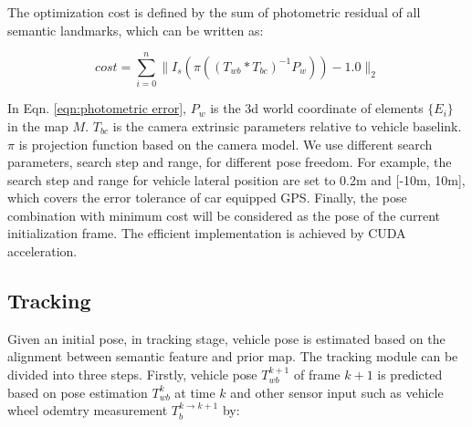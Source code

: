 \documentclass[letterpaper, 10 pt, conference]{ieeeconf}
\begin{document}




The optimization cost is defined by the sum of photometric residual \cite{engel2017direct} of all semantic landmarks, which can be written as: 


\begin{equation}
    cost = \sum_{i = 0}^n \|I_s(\pi((T_{wb} * T_{bc})^{-1}P_w)) - 1.0 \|_2
\label{eqn:photometric error}    
\end{equation}

In Eqn. \ref{eqn:photometric error}, $P_{w}$ is the 3d world coordinate of elements $\{E_i\}$ in the map $M$.
$T_{bc}$ is the camera extrinsic parameters relative to vehicle baselink.
$\pi$ is projection function based on the camera model. 
We use different search parameters, search step and range, for different pose freedom. For example, the search step and range for vehicle lateral position are set to 0.2m and [-10m, 10m], which covers the error tolerance of car equipped GPS. Finally, the pose combination with minimum cost will be considered as the pose of the current initialization frame. The efficient implementation is achieved by CUDA acceleration.



\subsection{Tracking}

Given an initial pose, in tracking stage, vehicle pose is estimated based on the alignment between semantic feature and prior map. The tracking module can be divided into three steps. Firstly, vehicle pose $T_{wb}^{k+1}$ of frame $k+1$ is predicted based on pose estimation $T_{wb}^{k}$ at time $k$ and other sensor input such as vehicle wheel odemtry measurement $T_{b}^{k \rightarrow k+1}$ by:
\end{document}
